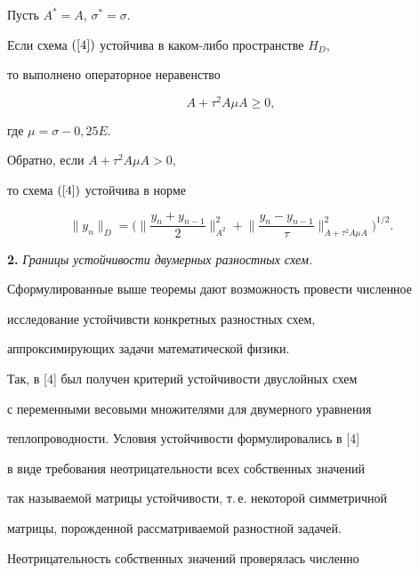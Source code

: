 \begin{thm}


Пусть $A^{*}=A$, $\sigma^{*}=\sigma$.


Если схема $(\ref{4})$ устойчива в каком-либо пространстве $H_{D}$,


то выполнено операторное неравенство




$$


A+\tau^{2} A\mu A\ge 0,




$$


где $\mu=\sigma -0,25E$.


Обратно, если $A+\tau^{2} A\mu A> 0$,


то схема $(\ref{4})$ устойчива в норме


$$


\|y_{n}\|_{D}=\bigg(\bigg\|\frac{y_{n}+y_{n-1}}{2}\bigg\|_{A^{2}}^{2} +


\bigg\|\frac{y_{n}-y_{n-1}}{\tau}\bigg\|_{A+\tau^{2} A\mu A}^{2}


\bigg)^{1/2}.


$$


\end{thm}





{\bf 2.} {\it Границы устойчивости двумерных разностных схем.}


Сформулированные выше теоремы дают возможность провести численное 


исследование устойчивсти конкретных разностных схем,


аппроксимирующих задачи математической физики.


Так, в [4] был получен критерий устойчивости двуслойных схем 


с переменными весовыми множителями для двумерного уравнения 


теплопроводности. Условия устойчивости формулировались в [4] 


в виде требования неотрицательности всех собственных значений 


так называемой матрицы устойчивости, т.\,е.{} некоторой симметричной 


матрицы, порожденной рассматриваемой разностной задачей. 


Неотрицательность собственных значений проверялась численно 


